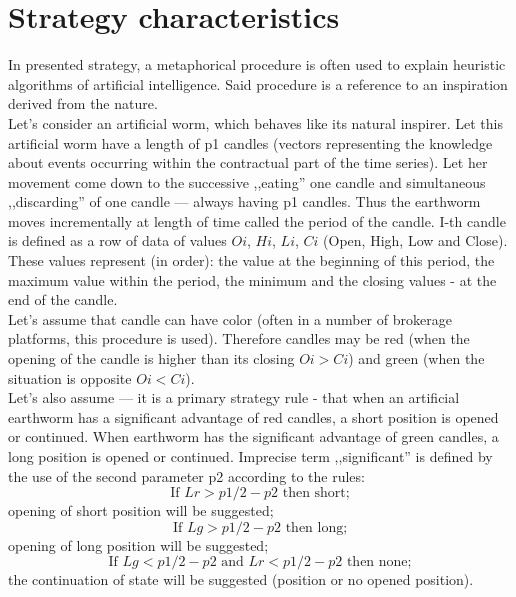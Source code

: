 \documentclass[runningheads,a4paper]{llncs}
\begin{document}
\section{Strategy characteristics}
In presented strategy, a metaphorical procedure is often used to explain heuristic algorithms of artificial intelligence. Said procedure is a reference to an inspiration derived from the nature.\\

Let's consider an artificial worm, which behaves like its natural inspirer. Let this artificial worm have a length of p1 candles (vectors representing the knowledge about events occurring within the contractual part of the time series). Let her movement come down to the successive ,,eating'' one candle and simultaneous ,,discarding'' of one candle --- always having p1 candles. Thus the earthworm moves incrementally at length of time called the period of the candle. I-th candle is  defined as a row of data of values  $Oi$, $Hi$, $Li$, $Ci$ (Open, High, Low and Close). These values represent (in order): the value at the beginning of this period, the maximum value within the period, the minimum and the closing values - at the end of the candle.\\
Let's assume that candle can have color (often in a number of brokerage platforms, this procedure is used). Therefore candles may be red (when the opening of the candle is higher than its closing $Oi>Ci$) and green (when the situation is opposite $Oi<Ci$).\\
Let's also assume --- it is a primary strategy rule - that when an artificial earthworm has a significant advantage of red candles, a short position is opened or continued. When earthworm has the significant advantage of green candles, a long position is opened or continued. Imprecise term ,,significant'' is defined by the use of the second parameter p2 according to the rules:
\begin{equation}
\text{If }  Lr > p1/2 -p2 \text{ then short;}
\end{equation}
opening of short position will be suggested;
\begin{equation}
\text{If }  Lg > p1/2 -p2 \text{ then long;}
\end{equation}
opening of long position will be suggested;
\begin{equation}
\text{If }  Lg < p1/2 -p2 \text{ and } Lr< p1/2-p2 \text{ then none;}
\label{eq:eq3}
\end{equation}
the continuation of state will be suggested (position or no opened position).\\
\end{document}
